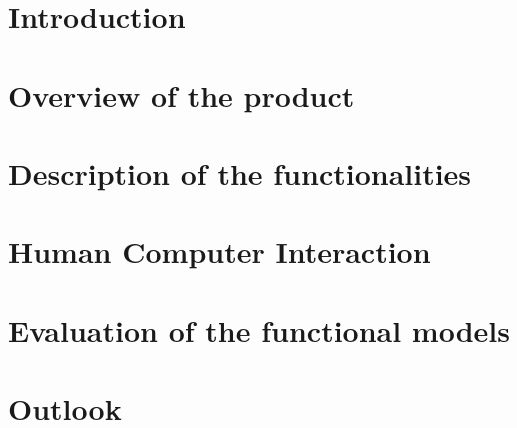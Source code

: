 \documentclass[a4paper]{article}
\begin{document}
	
	
	
	\clearpage
	
	\tableofcontents
	\clearpage
	
	\section{Introduction}
	
	
	\section{Overview of the product}
	
		
	\section{Description of the functionalities}
	
		
	\section{Human Computer Interaction}
	
		
	\section{Evaluation of the functional models}
	
		
	\section{Outlook}
	
	
	\clearpage
	{}
	
	
\end{document}
